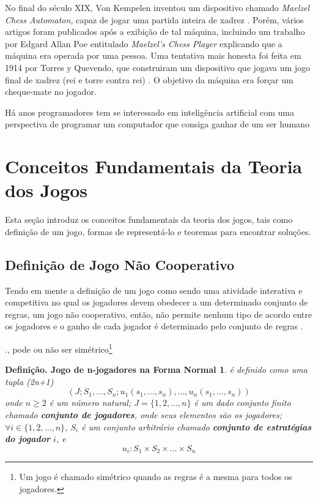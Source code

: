 No final do século XIX, Von Kempelen inventou um dispositivo chamado \emph{Maelzel Chess Automaton}, capaz de jogar uma partida inteira de xadrez \cite{shannon_1950}. Porém, vários artigos foram publicados após a exibição de tal máquina, incluindo um trabalho por Edgard Allan Poe entitulado \emph{Maelzel's Chess Player} explicando que a máquina era operada por uma pessoa. Uma tentativa mais honesta foi feita em 1914 por Torres y Quevendo, que construiram um dispositivo que jogava um jogo final de xadrez (rei e torre contra rei) \cite{vigneron_1914}. O objetivo da máquina era forçar um cheque-mate no jogador.

Há anos programadores tem se interessado em inteligência artificial com uma perspectiva de programar um computador que consiga ganhar de um ser humano \cite{samuel_1959} \cite{samuel_1967}

\section{Conceitos Fundamentais da Teoria dos Jogos}
\label{sec:conceitos-fundamentais-da-teoria-dos-jogos}

Esta seção introduz os conceitos fundamentais da teoria dos jogos, tais como definição de um jogo, formas de representá-lo e teoremas para encontrar soluções.

\subsection{Definição de Jogo Não Cooperativo}
\label{subsec:definicao-de-jogo-nao-cooperativo}

Tendo em mente a definição de um jogo como sendo uma atividade interativa e competitiva no qual os jogadores devem obedecer a um determinado conjunto de regras, um jogo não cooperativo, então, não permite nenhum tipo de acordo entre os jogadores e o ganho de cada jogador é determinado pelo conjunto de regras \cite{jones_1980}.


 ., pode ou não ser simétrico\footnote{Um jogo é chamado simétrico quando as regras é a mesma para todos os jogadores.}


\newtheorem*{JFN}{Definição. Jogo de n-jogadores na Forma Normal}

\begin{JFN}
é definido como uma tupla (2n+1)
$$(J; S_1,...,S_n; u_1(s_1,...,s_n),...,u_n(s_1,...,s_n))$$
onde $n \geq 2$ é um número natural; $J = \{1,2,...,n\}$ é um dado conjunto finito chamado \textbf{conjunto de jogadores}, onde seus elementos são os jogadores; $\forall i\in \{1,2,...,n\}$, $S_i$ é um conjunto arbitrário chamado \textbf{conjunto de estratégias do jogador} $i$, e $$u_i: S_1 \times S_2 \times ...\times S_n$$
\end{JFN}

